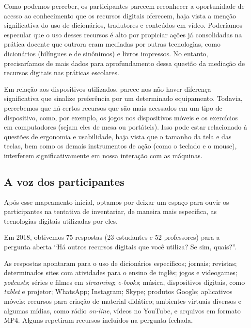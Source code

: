 \documentclass[portuguese]{textolivre}
\begin{document}
Como podemos perceber, os participantes parecem reconhecer a oportunidade de acesso ao conhecimento que os recursos digitais oferecem, haja vista a menção significativa do uso de dicionários, tradutores e conteúdos em vídeo. Poderíamos especular que o uso desses recursos é alto por propiciar ações já consolidadas na prática docente que outrora eram mediadas por outras tecnologias, como dicionários (bilíngues e de sinônimos) e livros impressos. No entanto, precisaríamos de mais dados para aprofundamento dessa questão da mediação de recursos digitais nas práticas escolares.

Em relação aos dispositivos utilizados, parece-nos não haver diferença significativa que sinalize preferência por um determinado equipamento. Todavia, percebemos que há certos recursos que são mais acessados em um tipo de dispositivo, como, por exemplo, os jogos nos dispositivos móveis e os exercícios em computadores (sejam eles de mesa ou portáteis). Isso pode estar relacionado à questões de ergonomia e usabilidade, haja vista que o tamanho da tela e das teclas, bem como os demais instrumentos de ação (como o teclado e o mouse), interferem significativamente em nossa interação com as máquinas.

\subsection{A voz dos participantes}\label{sec-formato}
Após esse mapeamento inicial, optamos por deixar um espaço para ouvir os participantes na tentativa de inventariar, de maneira mais específica, as tecnologias digitais utilizadas por eles.

Em 2018, obtivemos 75 respostas (23 estudantes e 52 professores) para a pergunta aberta “Há outros recursos digitais que você utiliza? Se sim, quais?”.

As respostas apontaram para o uso de dicionários específicos; jornais; revistas; determinados sites com atividades para o ensino de inglês; jogos e videogames; \textit{podcasts}; séries e filmes em \textit{streaming}; \textit{e-books}; música, dispositivos digitais, como \textit{tablet} e projetor; WhatsApp; Instagram; Skype; produtos Google; aplicativos móveis; recursos para criação de material didático; ambientes virtuais diversos e algumas mídias, como rádio \textit{on-line}, vídeos no YouTube, e arquivos em formato MP4. Alguns repetiram recursos incluídos na pergunta fechada.  
\end{document}
